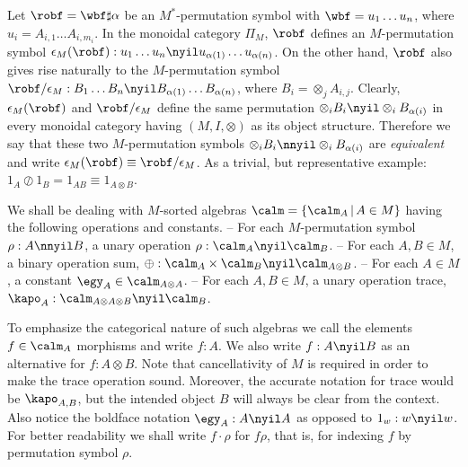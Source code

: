 \documentclass{eptcs}
\begin{document}
Let $\robf =\wbf \sharp \alpha $ be an $M^*$-permutation symbol with $\wbf =
u_1\ldots u_n$, where $u_i=A_{i,1}\ldots A_{i,m_i}$. In the monoidal category
$\Pi _{M}$, $\robf $ defines an $M$-permutation symbol
$\epsilon _{M}(\robf ): u_1\ldots u_n\nyil u_{\alpha (1)}\ldots u_{\alpha (n)}$.
On the other hand, $\robf $ also gives rise naturally to the $M$-permutation
symbol $\robf /\epsilon _{M}: B_1\ldots B_n\nyil B_{\alpha (1)}\ldots 
B_{\alpha (n)}$, where $B_i=\otimes _j A_{i,j}$. Clearly, 
$\epsilon _{M}(\robf)$ and $\robf /\epsilon _M$ define the same permutation
$\otimes _i B_i\nyil \otimes _i B_{\alpha (i)}$ in every monoidal category
having $(M,I,\otimes )$ as its object structure. Therefore we say that these
two $M$-permutation symbols $\otimes _i B_i\nnyil \otimes _i B_{\alpha (i)}$
are {\em equivalent\/} and write  $\epsilon _{M}(\robf)\equiv 
\robf /\epsilon _M$. As a trivial, but representative example:
$1_A\oslash 1_B = 1_{AB}\equiv 1_{A\otimes B}$.

 We shall be dealing with $M$-sorted algebras $\calm =\{\calm _A\,|\,A\in M\}$ having
the following operations and constants.
\vsp \newline 
  -- For each $M$-permutation symbol $\rho:A\nnyil B$, a unary operation 
    $\rho :\calm _A\nyil \calm _B$.
\newline
  -- For each $A,B\in M$, a binary operation sum, $\oplus :\calm _A\times\calm _B\nyil
     \calm _{A\otimes B}$.
\newline
  -- For each $A\in M$, a constant $\egy _A\in \calm _{A\otimes A}$.
\newline
  -- For each $A,B\in M$, a unary operation trace, $\kapo _A:\calm _{A\otimes A\otimes B}
     \nyil \calm _B$.
\vsp

To emphasize the categorical nature of such algebras we call the elements $f\in \calm _A$
morphisms and write $f:A$. We also write $f:A\nyil B$ as an alternative
for $f:A\otimes B$.   
Note that cancellativity of $M$ is required in order to make the trace operation sound.
Moreover, the accurate notation for trace would be $\kapo _{A,B}$, but the intended object 
$B$ will always be clear from the context.
Also notice the boldface notation $\egy _A:A\nyil A$ as opposed to $1_w:w\nyil w$.
For better readability we shall write $f\cdot \rho $ for $f\rho $, that is, for indexing
$f$ by permutation symbol $\rho $.
\end{document}
